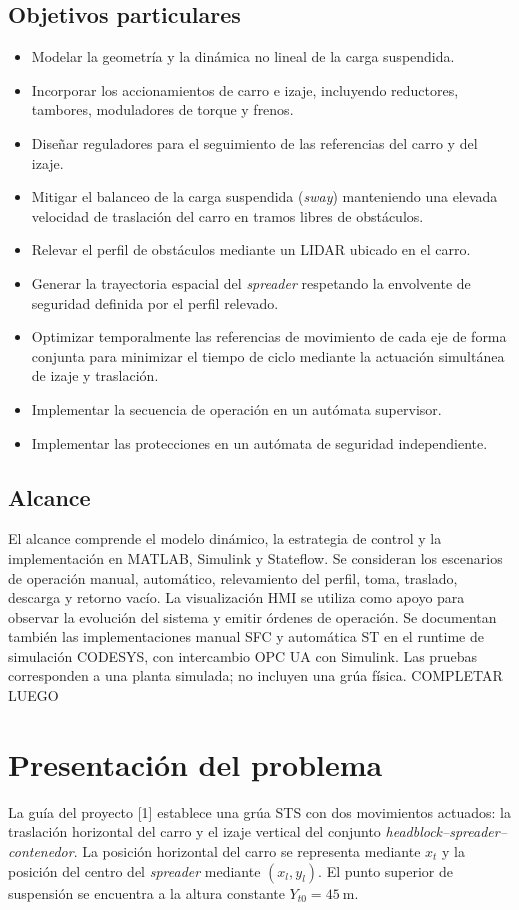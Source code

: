 \documentclass[a4paper,10pt,onecolumn,journal]{ieeeconf}
\numberwithin{equation}{section}
\begin{document}
\subsection{Objetivos particulares}
\begin{itemize}
    \item Modelar la geometría y la dinámica no lineal de la carga suspendida.
    \item Incorporar los accionamientos de carro e izaje, incluyendo reductores, tambores, moduladores de torque y frenos.
    \item Diseñar reguladores para el seguimiento de las referencias del carro y del izaje.
    \item Mitigar el balanceo de la carga suspendida (\textit{sway}) manteniendo una elevada velocidad de traslación del carro en tramos libres de obstáculos.
    \item Relevar el perfil de obstáculos mediante un LIDAR ubicado en el carro.
    \item Generar la trayectoria espacial del \textit{spreader} respetando la envolvente de seguridad definida por el perfil relevado.
    \item Optimizar temporalmente las referencias de movimiento de cada eje de forma conjunta para minimizar el tiempo de ciclo mediante la actuación simultánea de izaje y traslación.  
    \item Implementar la secuencia de operación en un autómata supervisor.
    \item Implementar las protecciones en un autómata de seguridad independiente.
\end{itemize}

\subsection{Alcance}
El alcance comprende el modelo dinámico, la estrategia de control y la implementación en MATLAB, Simulink y Stateflow. Se consideran los escenarios de operación manual, automático, relevamiento del perfil, toma, traslado, descarga y retorno vacío. La visualización HMI se utiliza como apoyo para observar la evolución del sistema y emitir órdenes de operación. Se documentan también las implementaciones manual SFC y automática ST en el runtime de simulación CODESYS, con intercambio OPC UA con Simulink. Las pruebas corresponden a una planta simulada; no incluyen una grúa física.
COMPLETAR LUEGO


\section{Presentación del problema}
La guía del proyecto [1] establece una grúa STS con dos movimientos actuados: la traslación horizontal del carro y el izaje vertical del conjunto \textit{headblock--spreader--contenedor}. La posición horizontal del carro se representa mediante $x_t$ y la posición del centro del \textit{spreader} mediante $(x_l,y_l)$. El punto superior de suspensión se encuentra a la altura constante $Y_{t0}=45~\mathrm{m}$.
\end{document}
